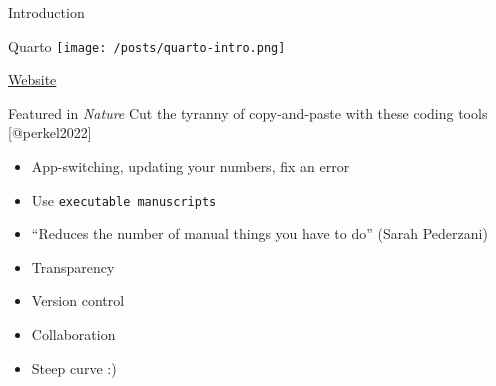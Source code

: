 \documentclass[
  ignorenonframetext,
  aspectratio=169,
]{beamer}
\providecommand{\tightlist}{%
  \setlength{\itemsep}{0pt}\setlength{\parskip}{0pt}}\usepackage{longtable,booktabs,array}
\begin{document}
\begin{frame}[fragile]{Introduction}
\label{introduction}
\begin{block}{Quarto}
\label{quarto}
\texttt{[image: /posts/quarto-intro.png]}

\href{https://quarto.org}{Website}
\end{block}

\begin{block}{Featured in \emph{Nature}}
\label{featured-in-nature}
Cut the tyranny of copy-and-paste with these coding tools
{[}@perkel2022{]}

\begin{itemize}[<+->]
\tightlist
\item
  App-switching, updating your numbers, fix an error
\item
  Use \texttt{executable\ manuscripts}
\item
  ``Reduces the number of manual things you have to do'' (Sarah
  Pederzani)
\item
  Transparency
\item
  Version control
\item
  Collaboration
\item
  Steep curve :)
\end{itemize}
\end{block}
\end{frame}
\end{document}
